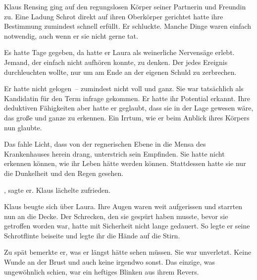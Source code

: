 Klaus Rensing ging auf den regungslosen Körper seiner Partnerin und Freundin zu. Eine Ladung Schrot direkt auf ihren Oberkörper gerichtet hatte ihre Bestimmung zumindest schnell erfüllt. Er schluckte. Manche Dinge waren einfach notwendig, auch wenn er sie nicht gerne tat.

\par

Es hatte Tage gegeben, da hatte er Laura als weinerliche Nervensäge erlebt. Jemand, der einfach nicht aufhören konnte, zu denken. Der jedes Ereignis durchleuchten wollte, nur um am Ende an der eigenen Schuld zu zerbrechen.

\par

Er hatte nicht gelogen~-- zumindest nicht voll und ganz. Sie war tatsächlich als Kandidatin für den Term infrage gekommen. Er hatte ihr Potential erkannt. Ihre deduktiven Fähigkeiten aber hatte er geglaubt, dass sie in der Lage gewesen wäre, das große und ganze zu erkennen. Ein Irrtum, wie er beim Anblick ihres Körpers nun glaubte.

\par

Das fahle Licht, dass von der regnerischen Ebene in die Mensa des Krankenhauses herein drang, unterstrich sein Empfinden. Sie hatte nicht erkennen können, wie ihr Leben hätte werden können. Stattdessen hatte sie nur die Dunkelheit und den Regen gesehen.

\par

, sagte er.  Klaus lächelte zufrieden. 

\par

Klaus beugte sich über Laura. Ihre Augen waren weit aufgerissen und starrten nun an die Decke. Der Schrecken, den sie gespürt haben musste, bevor sie getroffen worden war, hatte mit Sicherheit nicht lange gedauert. So legte er seine Schrotflinte beiseite und legte ihr die Hände auf die Stirn.

\par

Zu spät bemerkte er, was er längst hätte sehen müssen. Sie war unverletzt. Keine Wunde an der Brust und auch keine irgendwo sonst. Das einzige, was ungewöhnlich schien, war ein heftiges Blinken aus ihrem Revers.

